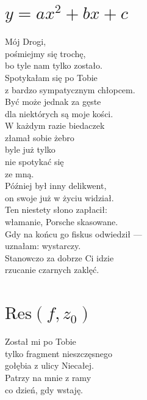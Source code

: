 \documentclass[12pt, a4paper]{memoir}
\renewenvironment{verse}{%
  \par\vspace{\baselineskip}\raggedright
}{
  \par\vspace{\baselineskip}
}
\begin{document}
\section[Równanie kwadratowe]{$y = ax^2 + bx + c$}
\begin{verse}
Mój Drogi,\\
pośmiejmy się trochę,\\
bo tyle nam tylko zostało.\\[\baselineskip]

Spotykałam się po Tobie\\
z bardzo sympatycznym chłopcem.\\
Być może jednak za gęste\\
dla niektórych są moje kości.\\
W każdym razie biedaczek\\
złamał sobie żebro\\
byle już tylko\\
nie spotykać się\\
ze mną.\\[\baselineskip]

Później był inny delikwent,\\
on swoje już w życiu widział.\\
Ten niestety słono zapłacił:\\
włamanie, Porsche skasowane.\\
Gdy na końcu go fiskus odwiedził ---\\
uznałam: wystarczy.\\[\baselineskip]

Stanowczo za dobrze Ci idzie\\
rzucanie czarnych zaklęć.
\end{verse}

\clearpage

\section[Residuum]{$\text{Res}(f, z_0)$}
\begin{verse}
Został mi po Tobie\\
tylko fragment nieszczęsnego\\
gołębia z ulicy Niecałej.\\[\baselineskip]

Patrzy na mnie z ramy\\
co dzień, gdy wstaję.
\end{verse}

\clearpage
\end{document}
